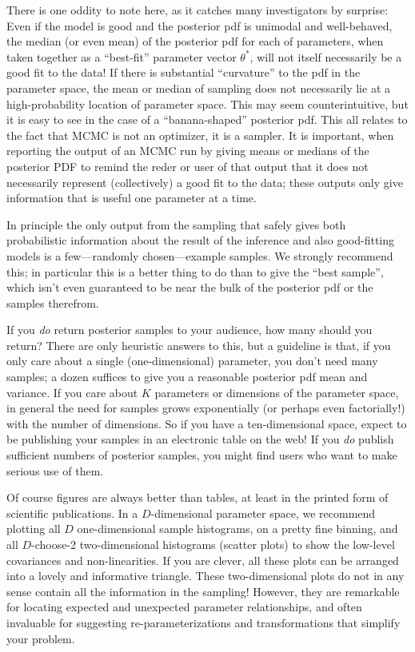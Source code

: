 \documentclass[12pt,twoside,pdftex]{article}
\newcommand{\pars}{\theta}
\begin{document}
There is one oddity to note here, as it catches many investigators by
surprise:
Even if the model is good and the posterior pdf is unimodal and well-behaved,
the median (or even mean) of the posterior pdf for each of parameters,
when taken together as a ``best-fit'' parameter vector $\pars^\ast$,
will not itself necessarily be a good fit to the data!
If there is substantial ``curvature'' to the pdf in the parameter
space, the mean or median of sampling does not necessarily lie at a
high-probability location of parameter space.
This may seem counterintuitive, but it is easy to see in the case of a
``banana-shaped'' posterior pdf.
This all relates to the fact that MCMC is not an optimizer, it is a
sampler.
It is important, when reporting the output of an MCMC run by giving
means or medians of the posterior PDF to remind the reder or user of
that output that it does not necessarily represent (collectively) a
good fit to the data; these outputs only give information that is
useful one parameter at a time.

In principle the only output from the sampling that safely gives both
probabilistic information about the result of the inference and also
good-fitting models is a few---randomly chosen---example samples.
We strongly recommend this;
in particular this is a better thing to do
than to give the ``best sample'', which isn't even guaranteed to be
near the bulk of the posterior pdf or the samples therefrom.

If you \emph{do} return posterior samples to your audience, how many
should you return?
There are only heuristic answers to this, but a guideline is that, if
you only care about a single (one-dimensional) parameter, you don't
need many samples; a dozen suffices to give you a reasonable posterior
pdf mean and variance.
If you care about $K$ parameters or dimensions of the parameter space,
in general the need for samples grows exponentially (or perhaps even
factorially!) with the number of dimensions.
So if you have a ten-dimensional space, expect to be publishing your
samples in an electronic table on the web!
If you \emph{do} publish sufficient numbers of posterior samples, you
might find users who want to make serious use of them.

Of course figures are always better than tables, at least in the
printed form of scientific publications.
In a $D$-dimensional parameter space, we recommend plotting all $D$
one-dimensional sample histograms, on a pretty fine binning, and all
$D$-choose-2 two-dimensional histograms (scatter plots) to show the
low-level covariances and non-linearities.
If you are clever, all these plots can be arranged into a lovely and
informative triangle.
These two-dimensional plots do not in any sense contain all the
information in the sampling!  However, they are remarkable for
locating expected and unexpected parameter relationships, and often
invaluable for suggesting re-parameterizations and transformations
that simplify your problem.
\end{document}
